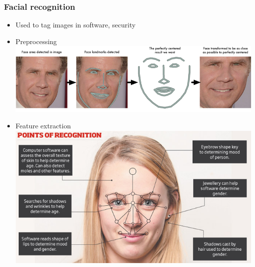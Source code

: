 \documentclass{beamer}
\begin{document}
\begin{frame}
\frametitle{Facial recognition}
\begin{itemize}
\item Used to tag images in software, security \pause
\item Preprocessing
\includegraphics[scale = 0.4]{face_alignment.png}
\pause
\item Feature extraction
\includegraphics[scale = 0.4]{facerec_features.jpg}
\end{itemize}
\end{frame}
\end{document}
